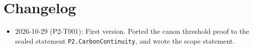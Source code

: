 \documentclass[11pt]{article}
\theoremstyle{remark}
\begin{document}
\section{Changelog}
\begin{itemize}
\item 2026-10-29 (P2-T001): First version. Ported the canon threshold proof to the sealed statement
\texttt{P2.CarbonContinuity}, and wrote the scope statement.
\end{itemize}



\end{document}
